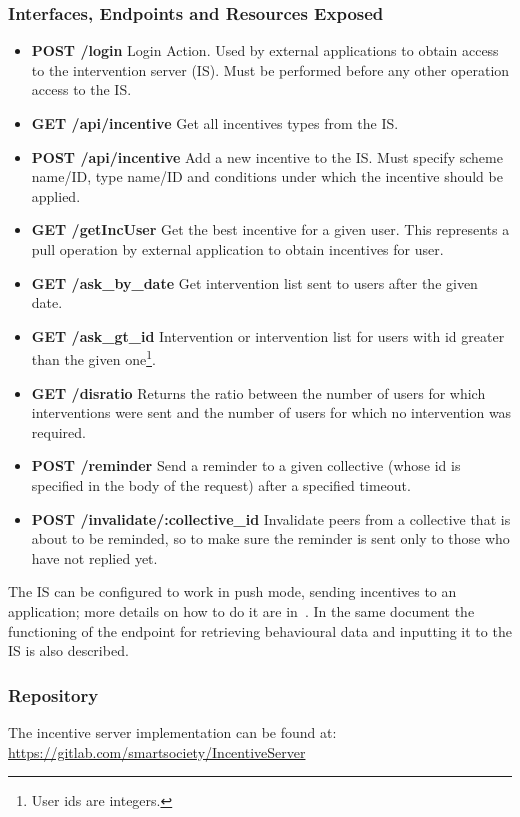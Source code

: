 \subsubsection{Interfaces, Endpoints and Resources Exposed}
\begin{itemize}
\item {\bf POST /login} Login Action. Used by external applications to obtain access to the intervention server (IS). Must be performed before any other operation access to the IS.
\item {\bf GET /api/incentive} Get all incentives types from the IS.
\item {\bf POST /api/incentive} Add a new incentive to the IS. Must specify scheme name/ID, type name/ID and conditions under which the incentive should be applied.
\item {\bf GET /getIncUser} Get the best incentive for a given user. This represents a pull operation by external application to obtain incentives for user.
\item {\bf GET /ask\_by\_date}  Get intervention list sent to users after the given date. 
\item {\bf GET /ask\_gt\_id} Intervention or intervention list for users with id greater than the given one\footnote{User ids are integers.}.
\item {\bf GET /disratio} Returns the ratio between the number of users for which interventions were sent and the number of users for which no intervention was required.
\item {\bf POST /reminder} Send a reminder to a given collective (whose id is specified in the body of the request) after a specified timeout.
\item {\bf POST /invalidate/:collective\_id} Invalidate peers from a collective that is about to be reminded, so to make sure the reminder is sent only to those who have not replied yet.
\end{itemize}
The IS can be configured to work in push mode, sending incentives to an application; more details on how to do it are in~\cite{D5.4}. In the same document the functioning of the endpoint for retrieving behavioural data and inputting it to the IS is also described.
\subsubsection{Repository}
The incentive server implementation can be found at: \url{https://gitlab.com/smartsociety/IncentiveServer}